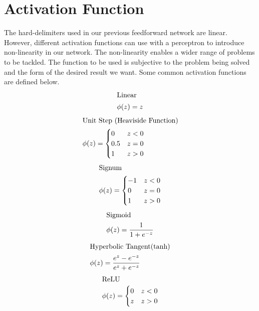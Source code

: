 \section{Activation Function}
The hard-delimiters used in our previous feedforward network are linear. However, different activation functions can use with a perceptron to introduce non-linearity in our network. The non-linearity enables a wider range of problems to be tackled. The function to be used is subjective to the problem being solved and the form of the desired result we want. Some common activation functions are defined below.
\begin{align}
\intertext{Linear}
  \phi(z) = z
\end{align}
\begin{align}
\intertext{Unit Step (Heaviside Function)}
  \phi(z) = \begin{cases}
    0 & z<0 \\
    0.5 & z=0 \\
    1 & z>0
  \end{cases}
\end{align}
\begin{align}
  \intertext{Signum}
  \phi(z) = \begin{cases}
    -1 & z<0 \\
    0 & z=0 \\
    1 & z>0
  \end{cases}
\end{align}
\begin{align}
  \intertext{Sigmoid}
  \phi(z) = \frac{1}{1+ e^{-z}}
\end{align}
\begin{align}
  \intertext{Hyperbolic Tangent(tanh)}
  \phi(z) = \frac{e^z - e^{-z}}{e^z + e^{-z}}
\end{align}
\begin{align}
  \intertext{ReLU}
  \phi(z) = \begin{cases}
    0 & z<0 \\
    z & z>0
  \end{cases}
\end{align}
\newpage
